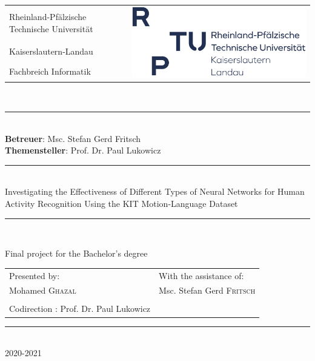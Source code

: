 \begin{titlepage}
    \centering
    \begin{tabular}{p{}p{}}
        Rheinland-Pfälzische Technische Universität& \multirow{3}{*}{\includegraphics[width=.45\textwidth]{img/TUK.png}}\\
        Kaiserslautern-Landau&\\
        Fachbreich Informatik&\\
    \end{tabular}\\[\baselineskip]
    \rule{\textwidth}{1pt}\\[.5\baselineskip]
    \textbf{Betreuer}: Msc. Stefan Gerd Fritsch\\
    \textbf{Themensteller}: Prof. Dr. Paul Lukowicz\\[.25\baselineskip]
    \rule{.8\textwidth}{1.6pt}\\[.25\baselineskip]
        Investigating the Effectiveness of Different Types of Neural Networks for Human Activity Recognition Using the KIT Motion-Language Dataset\\[.4\baselineskip]
	\rule{.8\textwidth}{1.6pt}\\[.25\baselineskip]\vfill
	\begin{center}
    	\begin{minipage}{\textwidth}\bfseries
    	    \begin{center}
    	        {\large Final project for the Bachelor's degree}
    	    \end{center}
    	    {\normalfont\bfseries
    	    \begin{tabular}{p{}p{}}
    	        Presented by: & With the assistance of:\\
    	        Mohamed \textsc{Ghazal} & Msc. Stefan Gerd \textsc{Fritsch}\\
    	        \\ Codirection : Prof. Dr. Paul Lukowicz
    	    \end{tabular}}
    	\end{minipage}
	\end{center}
	\rule{\textwidth}{1pt}\\[.5\baselineskip]
	2020-2021
\end{titlepage}
\restoregeometry 
